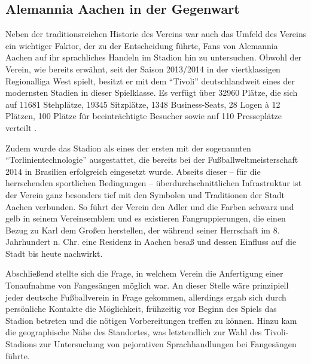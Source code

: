 \subsection{Alemannia Aachen in der Gegenwart}
Neben der traditionsreichen Historie des Vereins war auch das Umfeld des Vereins ein wichtiger Faktor, der zu der Entscheidung führte, Fans von Alemannia Aachen auf ihr sprachliches Handeln im Stadion hin zu untersuchen.
Obwohl der Verein, wie bereits erwähnt, seit der Saison 2013/2014 in der viertklassigen Regionalliga West spielt, besitzt er mit dem "`Tivoli"' deutschlandweit eines der modernsten Stadien in dieser Spielklasse.
Es verfügt über 32960 Plätze, die sich auf 11681 Stehplätze, 19345 Sitzplätze, 1348 Business-Seats, 28 Logen à 12 Plätzen, 100 Plätze für beeinträchtigte Besucher sowie auf 110 Presseplätze verteilt \cite{AA15}.

Zudem wurde das Stadion als eines der ersten mit der sogenannten "`Torlinientechnologie"' ausgestattet, die bereits bei der Fußballweltmeisterschaft 2014 in Brasilien erfolgreich eingesetzt wurde.
Abseits dieser – für die herrschenden sportlichen Bedingungen – überdurchschnittlichen Infrastruktur ist der Verein ganz besonders tief mit den Symbolen und Traditionen der Stadt Aachen verbunden.
So führt der Verein den Adler und die Farben schwarz und gelb in seinem Vereinsemblem und es existieren Fangruppierungen, die einen Bezug zu Karl dem Großen herstellen, der während seiner Herrschaft im 8. Jahrhundert n. Chr. eine Residenz in Aachen besaß und dessen Einfluss auf die Stadt bis heute nachwirkt.

Abschließend stellte sich die Frage, in welchem Verein die Anfertigung einer Tonaufnahme von Fangesängen möglich war.
An dieser Stelle wäre prinzipiell jeder deutsche Fußballverein in Frage gekommen, allerdings ergab sich durch persönliche Kontakte die Möglichkeit, frühzeitig vor Beginn des Spiels das Stadion betreten und die nötigen Vorbereitungen treffen zu können.
Hinzu kam die geographische Nähe des Standortes, was letztendlich zur Wahl des Tivoli-Stadions zur Untersuchung von pejorativen Sprachhandlungen bei Fangesängen führte.
